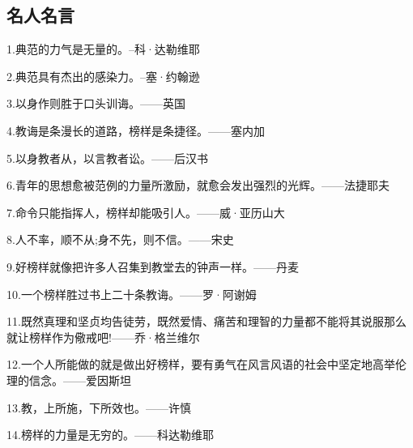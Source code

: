 \documentclass[UTF8]{ctexart}
\begin{document}
\subsection{名人名言}
1.典范的力气是无量的。–科·达勒维耶\par
2.典范具有杰出的感染力。–塞·约翰逊\par
3.以身作则胜于口头训诲。——英国\par
4.教诲是条漫长的道路，榜样是条捷径。——塞内加\par
5.以身教者从，以言教者讼。——后汉书\par
6.青年的思想愈被范例的力量所激励，就愈会发出强烈的光辉。——法捷耶夫\par
7.命令只能指挥人，榜样却能吸引人。——威·亚历山大\par
8.人不率，顺不从;身不先，则不信。——宋史\par\par
9.好榜样就像把许多人召集到教堂去的钟声一样。——丹麦\par
10.一个榜样胜过书上二十条教诲。——罗·阿谢姆\par
11.既然真理和坚贞均告徒劳，既然爱情、痛苦和理智的力量都不能将其说服那么就让榜样作为儆戒吧!——乔·格兰维尔\par
12.一个人所能做的就是做出好榜样，要有勇气在风言风语的社会中坚定地高举伦理的信念。——爱因斯坦\par
13.教，上所施，下所效也。——许慎\par
14.榜样的力量是无穷的。——科达勒维耶\par
\end{document}
